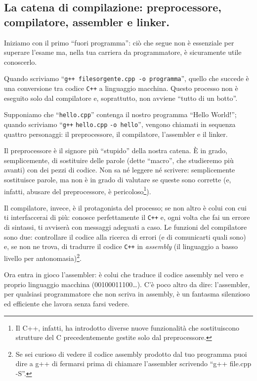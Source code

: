 	\begin{small}
	\subsection{La catena di compilazione: preprocessore, compilatore, assembler e linker.}\label{catena}
	Iniziamo con il primo ``fuori programma'': ciò che segue non è essenziale per superare l'esame ma, nella tua carriera da programmatore, è sicuramente utile conoscerlo. 
	
	Quando scriviamo ``\verb|g++ filesorgente.cpp -o programma|'', quello che succede è una conversione tra codice \verb|C++| a linguaggio macchina. Questo processo non è eseguito solo dal compilatore e, soprattutto, non avviene ``tutto di un botto''. 
	
	Supponiamo che ``\verb|hello.cpp|'' contenga il nostro programma ``Hello World!''; quando scriviamo ``\verb|g++|  \verb|hello.cpp| \verb|-o hello|'', vengono chiamati in sequenza quattro personaggi: il preprocessore, il compilatore, l'assembler e il linker.
	
	Il preprocessore è il signore più ``stupido'' della nostra catena. È in grado, semplicemente, di sostituire delle parole (dette ``macro'', che studieremo più avanti) con dei pezzi di codice. Non sa né leggere né scrivere: semplicemente sostituisce parole, ma non è in grado di valutare se queste sono corrette (e, infatti, abusare del preprocessore, è pericoloso\footnote{Il C++, infatti, ha introdotto diverse nuove funzionalità che sostituiscono strutture del C precedentemente gestite solo dal preprocessore.}). 
	
	Il compilatore, invece, è il protagonista del processo; se non altro è colui con cui ti interfaccerai di più: conosce perfettamente il \verb|C++| e, ogni volta che fai un errore di sintassi, ti avviserà con messaggi adeguati a caso. Le funzioni del compilatore sono due: controllare il codice alla ricerca di errori (e di comunicarti quali sono) e, se non ne trova, di tradurre il codice \verb|C++| in \emph{assembly} (il linguaggio a basso livello per antonomasia)\footnote{Se sei curioso di vedere il codice assembly prodotto dal tuo programma puoi dire a g++ di fermarsi prima di chiamare l'assembler scrivendo ``g++ file.cpp -S''.}.
	
	Ora entra in gioco l'assembler: è colui che traduce il codice assembly nel vero e proprio linguaggio macchina (00100011100\ldots). C'è poco altro da dire: l'assembler, per qualsiasi programmatore che non scriva in assembly, è un fantasma silenzioso ed efficiente che lavora senza farsi vedere.
	

\end{small}
